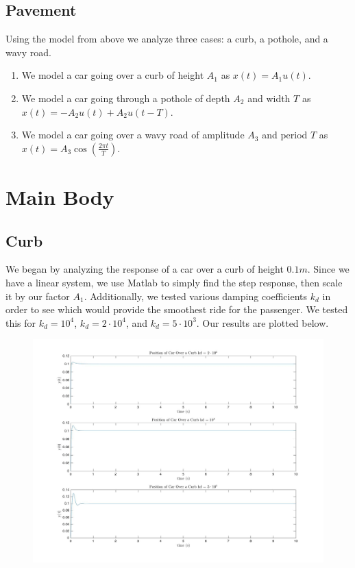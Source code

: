 \documentclass{article}
\begin{document}
\subsection{Pavement}
Using the model from above we analyze three cases: a curb, a pothole, and a wavy road.
\begin{enumerate}
\item We model a car going over a curb of height $A_1$ as $x(t) = A_1 u(t)$.
\item We model a car going through a pothole of depth $A_2$ and width $T$ as $ x(t) = -A_2 u(t) + A_2 u(t-T)$.
\item We model a car going over a wavy road of amplitude $A_3$ and period $T$ as $x(t) = A_3 \cos(\frac{2\pi t}{T}).$
\end{enumerate}


\section{Main Body}

\subsection{Curb}

We began by analyzing the response of a car over a curb of height $\si{0.1m}$. Since we have a linear system, we use Matlab to simply find the step response, then scale it by our factor $A_1$. Additionally, we tested various damping coefficients $k_d$ in order to see which would provide the smoothest ride for the passenger. We tested this for $k_d =10^4$, $k_d = 2\cdot 10^4$, and $k_d = 5 \cdot 10^3$. Our results are plotted below.

\begin{figure}[!htbp]
\begin{minipage}{\linewidth}
\includegraphics[width = 1\linewidth, height = 0.4\textheight]{curb.jpg}
\end{minipage}
\end{figure}
\end{document}
